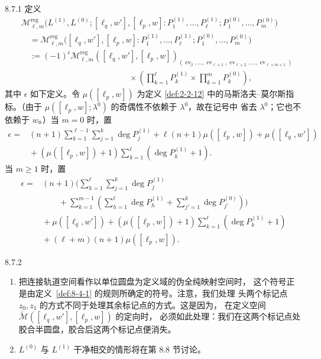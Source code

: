 \begin{definition}{8.7.1}\label{def:8-7-1}
定义
\[
\begin{aligned}
 &\mathcal M^{\mathrm{reg}}_{\ell,m}
 \bigl(L^{(1)},L^{(0)};[\ell_q,w'],[\ell_p,w]:
 P_1^{(1)},\ldots,P_\ell^{(1)};
 P_1^{(0)},\ldots,P_m^{(0)}\bigr)\\
 &\quad=
 \mathcal M^{\mathrm{reg}}_{\ell,m}
 \bigl([\ell_q,w'],[\ell_p,w]:
 P_1^{(1)},\ldots,P_\ell^{(1)};
 P_1^{(0)},\ldots,P_m^{(0)}\bigr)\\
 &\quad:=(-1)^\epsilon
 \mathcal M^{\mathrm{reg}}_{\ell,m}
 ([\ell_q,w'],[\ell_p,w])_{
 (\operatorname{ev}_2,\ldots,\operatorname{ev}_{\ell+1},
  \operatorname{ev}_{\ell+2},\ldots,
  \operatorname{ev}_{\ell+m+1})}\\[-2pt]
 &\hspace{13em}{}\times
 \left(\prod_{k=1}^{\ell}P_k^{(1)}
 \times\prod_{k=1}^{m}P_k^{(0)}\right),
\end{aligned}
\]
其中 $\epsilon$ 如下定义。令 $\mu([\ell_p,w])$ 为定义
\ref{def:2-2-12} 中的马斯洛夫--莫尔斯指标。（由于
$\mu([\ell_p,w];\lambda^0)$ 的奇偶性不依赖于 $\lambda^0$，故在记号中
省去 $\lambda^0$；它也不依赖于 $w$。）当 $m=0$ 时，置
\[
\begin{aligned}
 \epsilon={}&(n+1)\sum_{k=1}^{\ell-1}\sum_{j=1}^{k}
 \deg P_j^{(1)}
 +\ell(n+1)\mu([\ell_p,w])+\mu([\ell_q,w'])\\
 &{}+(\mu([\ell_p,w])+1)
 \sum_{k=1}^{\ell}(\deg P_k^{(1)}+1).
\end{aligned}
\]
当 $m\geq1$ 时，置%
\[
\begin{aligned}
 \epsilon={}&(n+1)\Biggl(
 \sum_{k=1}^{\ell}\sum_{j=1}^{k}\deg P_j^{(1)}\\[-2pt]
 &\qquad{}+\sum_{k=1}^{m-1}\left(
   \sum_{h=1}^{\ell}\deg P_h^{(1)}
   +\sum_{j'=1}^{k}\deg P_{j'}^{(0)}\right)\Biggr)\\
 &{}+\mu([\ell_q,w'])
 +(\mu([\ell_p,w])+1)
 \sum_{k=1}^{\ell}(\deg P_k^{(1)}+1)\\
 &{}+(\ell+m)(n+1)\mu([\ell_p,w]).
\end{aligned}
\]
\end{definition}

\begin{remark}{8.7.2}\label{rem:8-7-2}
\begin{enumerate}[label=\textup{(\arabic*)},leftmargin=2.8em]
\item 把连接轨道空间看作以单位圆盘为定义域的伪全纯映射空间时，
这个符号正是由定义~\ref{def:8-4-1} 的规则所确定的符号。注意，我们处理
头两个标记点 $z_0,z_1$ 的方式不同于处理其余标记点的方式。这是因为，
在定义空间 $\widetilde{\mathcal M}([\ell_q,w'],[\ell_p,w])$ 的定向时，
必须如此处理：我们在这两个标记点处胶合半圆盘，胶合后这两个标记点便消失。

\item $L^{(0)}$ 与 $L^{(1)}$ 干净相交的情形将在第 8.8 节讨论。
\end{enumerate}
\end{remark}

